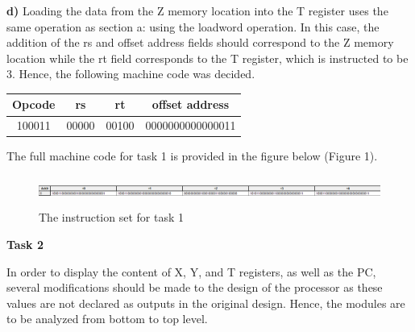 \documentclass[12pt,a4paper]{article}
\begin{document}
	\vspace{0.4cm}
	\noindent \textbf{ d)} Loading the data from the Z memory location into the T register uses the same operation as section a: using the loadword operation. In this case, the addition of the rs and offset address fields should correspond to the Z memory location while the rt field corresponds to the T register, which is instructed to be 3. Hence, the following machine code was decided. 
	
	\begin{table}[H]
		\centering
		\begin{tabular}{|c | c| c| c|}
			\hline
			\textbf{Opcode} & \textbf{rs} & \textbf{rt}& \textbf{offset address}\\ \hline
			100011& 00000 & 00100 & 0000000000000011\\\hline
		\end{tabular}
	\end{table}

	\noindent The full machine code for task 1 is provided in the figure below (Figure 1).
	
	\begin{figure}[H]
		\centering
		\includegraphics[height=1cm,width=14cm]{figures/code1.png}
		\caption{The instruction set for task 1}
	\end{figure}
	
	\vspace{0.2cm}
	\noindent \textbf{\large Task 2}
	\vspace{0.2cm}
	
	\noindent In order to display the content of X, Y, and T registers, as well as the PC, several modifications should be made to the design of the processor as these values are not declared as outputs in the original design. Hence, the modules are to be analyzed from bottom to top level.
	
\end{document}
